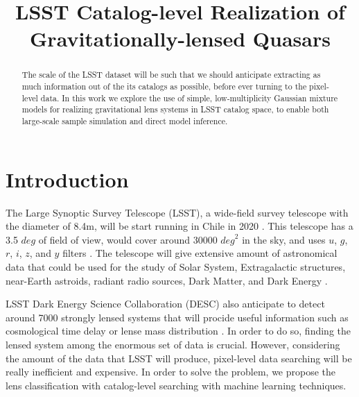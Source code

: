 \documentclass[\docopts]{\docclass}
\begin{document}
\title{ LSST Catalog-level Realization of Gravitationally-lensed Quasars }

\maketitlepre

\begin{abstract}

The scale of the LSST dataset will be such that we should anticipate
extracting as much information out of the its catalogs as possible,
before ever turning to the pixel-level data. In this work we explore the
use of simple, low-multiplicity Gaussian mixture models for realizing
gravitational lens systems in LSST catalog space, to enable both
large-scale sample simulation and direct model inference.

\end{abstract}

\maketitlepost


\section{Introduction}
\label{sec:intro}

The Large Synoptic Survey Telescope (LSST), a wide-field survey telescope with the diameter of 8.4m, will be start running in Chile in 2020 \cite{LSST_overall}. This telescope has a 3.5 $deg$ of field of view, would cover around 30000 $\textit{deg}^2$ in the sky, and uses $u$, $g$, $r$, $i$, $z$, and $y$ filters \cite{LSST_Science_Book_v2.0}. The telescope will give extensive amount of astronomical data that could be used for the study of Solar System, Extragalactic structures, near-Earth astroids, radiant radio sources, Dark Matter, and Dark Energy \cite{LSST_Science_Book_v2.0}. 

LSST Dark Energy Science Collaboration (DESC) also anticipate to detect around 7000 strongly lensed systems that will procide useful information such as cosmological time delay or lense mass distribution \cite{DESC_overall} \citep{time_delay_overall} \cite{Twinkles}. In order to do so, finding the lensed system among the enormous set of data is crucial. However, considering the amount of the data that LSST will produce, pixel-level data searching will be really inefficient and expensive. In order to solve the problem, we propose the lens classification with catalog-level searching with machine learning techniques.
\end{document}
